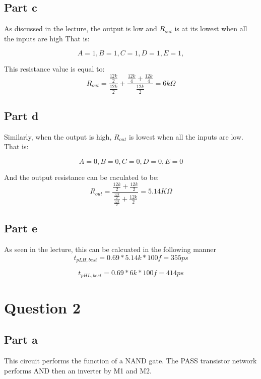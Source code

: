 \documentclass{article}
\begin{document}
\subsection*{Part c}
As discussed in the lecture, the output is low and $R_{out}$ is at its lowest when all the inputs are high
That is:

\begin{equation}
    A = 1,
    B = 1,
    C = 1,
    D = 1,
    E = 1,
\end{equation}

This resistance value is equal to:
\begin{equation}
    R_{out} = \frac{\frac{12k}{2}}{\frac{12k}{2}} + \frac{\frac{12k}{4} + \frac{12k}{4}}{\frac{12k}{2}} = 6k\Omega
\end{equation}

\subsection*{Part d}
Similarly, when the output is high, $R_{out}$ is lowest when all the inputs are low.
That is:

\begin{equation}
    A = 0, B= 0, C = 0, D = 0, E = 0
\end{equation}

And the output resistance can be caculated to be:
\begin{equation}
    R_{out} = \frac{\frac{12k}{2} + \frac{12k}{2}}{\frac{\frac{12k}{2}}{\frac{12k}{2}} + \frac{12k}{2}} = 5.14K\Omega
\end{equation}

\subsection*{Part e}
As seen in the lecture, this can be calcuated in the following manner
\begin{equation}
    t_{pLH, best} = 0.69 * 5.14k * 100f = 355 ps
\end{equation}

\begin{equation}
    t_{pHL, best} = 0.69 * 6k * 100f = 414 ps
\end{equation}

\section*{Question 2}
\subsection*{Part a}
This circuit performs the function of a NAND gate. The PASS transistor network performs AND
then an inverter  by M1 and M2.
\end{document}
